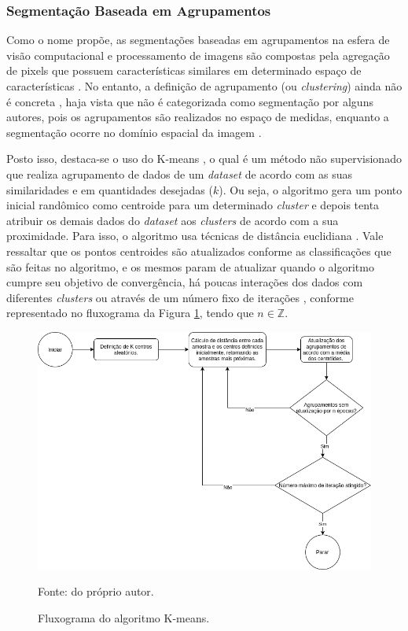 \subsubsection{Segmentação Baseada em Agrupamentos}
\label{segment:group}

Como o nome propõe, as segmentações baseadas em agrupamentos na esfera de visão computacional e processamento de imagens são compostas pela agregação de pixels que possuem características similares em determinado espaço de características \citep{Yuheng2017}. No entanto, a definição de agrupamento (ou \textit{clustering}) ainda não é concreta \citep{Yuheng2017}, haja vista que não é categorizada como segmentação por alguns autores, pois os agrupamentos são realizados no espaço de medidas, enquanto a segmentação ocorre no domínio espacial da imagem \citep{Haralick1985}.

Posto isso, destaca-se o uso do K-means \citep{macqueen1967some, bock2008origins}, o qual é um método não supervisionado que realiza agrupamento de dados de um \textit{dataset} de acordo com as suas similaridades e em quantidades desejadas ($k$). Ou seja, o algoritmo gera um ponto inicial randômico como centroide para um determinado \textit{cluster} e depois tenta atribuir os demais dados do \textit{dataset} aos \textit{clusters} de acordo com a sua proximidade. Para isso, o algoritmo usa técnicas de distância euclidiana \citep{Mahmud2012}. Vale ressaltar que os pontos centroides são atualizados conforme as classificações que são feitas no algoritmo, e os mesmos param de atualizar quando o algoritmo cumpre seu objetivo de convergência, há poucas interações dos dados com diferentes \textit{clusters} ou através de um número fixo de iterações \citep{dunham2006data}, conforme representado no fluxograma da Figura \ref{segment:fig:6}, tendo que $n \in \mathbb{Z}$.

\begin{figure}[H]
    \centering
    \caption{Fluxograma do algoritmo K-means.}
    \includegraphics[width=1\linewidth]{recursos/imagens/image_seg/kmeans.png}
    \label{segment:fig:6}

    Fonte: do próprio autor.
\end{figure}

